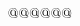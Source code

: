 $${\uccode`4=`b \uccode`5=`i \uccode`6=`n
 \uppercase{\gdef\mathbin@#1#2#3{%
  \def\next@##1\mathbin@{\ifx\space@\next\global\mathbin@true\fi}%
 \global\mathbin@false\def\next##1\mathbin@{}%
 \ifx 4#1\ifx 5#2\ifx 6#3\def\next{\futurelet\next\next@}\fi\fi\fi\next}}}
\newif\ifmathrel@
{\uccode`4=`r \uccode`5=`e \uccode`6=`l
 \uppercase{\gdef\mathrel@#1#2#3{%
  \def\next@##1\mathrel@{\ifx\space@\next\global\mathrel@true\fi}%
 \global\mathrel@false\def\next##1\mathrel@{}%
 \ifx 4#1\ifx 5#2\ifx 6#3\def\next{\futurelet\next\next@}\fi\fi\fi\next}}}
\newif\ifmacro@
{\uccode`5=`m \uccode`6=`a \uccode`7=`c
 \uppercase{\gdef\macro@#1#2#3#4\macro@{\global\macro@false
  \ifx 5#1\ifx 6#2\ifx 7#3\global\macro@true
  \xdef\meaning@{\macro@@#4\macro@@}\fi\fi\fi}}}
\def\macro@@#1->#2\macro@@{#2}
\newif\ifDOTS@
\newcount\DOTSCASE@
{\uccode`6=`\\ \uccode`7=`D \uccode`8=`O \uccode`9=`T \uccode`0=`S
 \uppercase{\gdef\DOTS@#1#2#3#4#5{\global\DOTS@false\def\next##1\DOTS@{}%
  \ifx 6#1\ifx 7#2\ifx 8#3\ifx 9#4\ifx 0#5\let\next\DOTS@@\fi\fi\fi\fi\fi
  \next}}}
\let\DOTSX\relax
{\uccode`3=`B \uccode`4=`I \uccode`5=`X
 \uppercase{\gdef\DOTS@@#1{%
  \def\next{\futurelet\next\next@}%
  \def\next@##1\DOTS@{\ifx\space@\next\global\DOTS@true\fi}%
  \ifx 3#1\global\DOTSCASE@\z@\else
  \ifx 4#1\global\DOTSCASE@\@ne\else
  \ifx 5#1\global\DOTSCASE@\tw@\else\def\next##1\DOTS@{}%
  \fi\fi\fi\next}}}
\newif\ifnot@
{\uccode`5=`\\ \uccode`6=`n \uccode`7=`o \uccode`8=`t
 \uppercase{\gdef\not@#1#2#3#4{%
  \def\next@##1\not@{\ifx\space@\next\global\not@true\fi}%
 \global\not@false\def\next##1\not@{}%
 \ifx 5#1\ifx 6#2\ifx 7#3\ifx 8#4\def\next{\futurelet\next\next@}\fi\fi\fi\fi
 \next}}}
\newif\ifkeybin@
\def\keybin@{\keybin@true
 \ifx\next+\else\ifx\next=\else\ifx\next<\else\ifx\next>\else\ifx\next-\else
 \ifx\next*\else\ifx\next:\else\keybin@false\fi\fi\fi\fi\fi\fi\fi}
\def\dots{\ifmmode\let\next\mdots@\else\let\next\tdots@\fi\next}
\def\tdots@{\unskip\relaxnext@
 \def\next@{$\mathinner{\ldotp\ldotp\ldotp}\,
   \ifx\next,$\else\ifx\next.\,$\else\ifx\next;\,$\else\ifx\next:\,$\else
   \ifx\next?\,$\else\ifx\next!\,$\else$ \fi\fi\fi\fi\fi\fi}%
 \ \futurelet\next\next@}
\def\mdots@{\futurelet\next\mdots@@}
\def\mdots@@{\gdef\thedots@{\dotso@}%
 \ifx,\next\gdef\thedots@{\dotsc}\else
 \ifx\not\next\gdef\thedots@{\dotsb@}\else
  \keybin@
 \ifkeybin@\gdef\thedots@{\dotsb@}\else
  \xdef\meaning@{\meaning\next.........}\xdef\meaning@@{\meaning@}%
  \expandafter\math@\meaning@\math@
 \ifmath@
  \expandafter\mathch@\meaning@\mathch@\ifmathch@
}$$
